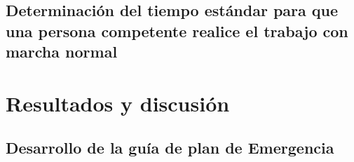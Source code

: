    \subsection{Determinación del tiempo estándar para que una persona competente realice el trabajo con marcha normal}
    
    
    
    
    
    \section{Resultados y discusión}
    
    \subsection{Desarrollo de la guía de plan de Emergencia}
    
